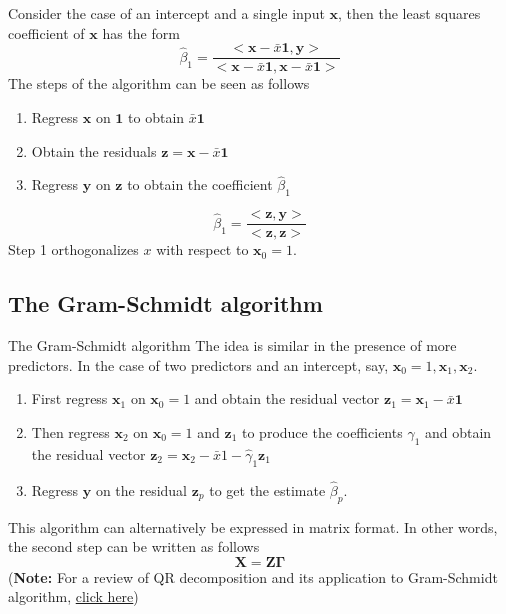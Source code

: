 \documentclass{beamer}
\newcommand{\x}{\bm{x}}
\newcommand{\X}{\bm{X}}
\newcommand{\z}{\bm{z}}
\newcommand{\y}{\bm{y}}
\begin{document}
\begin{frame}
Consider the case of an intercept and a single input $\bm{x}$, then the least squares coefficient of $\bm{x}$ has the form
\[
\hat{\beta}_1=\frac{<\bm{x}-\bar{x}\bm{1},\bm{y}>}{<\bm{x}-\bar{x}\bm{1},\bm{x}-\bar{x}\bm{1}>}
\]
The steps of the algorithm can be seen as follows
\begin{enumerate}
\item{} Regress $\bm{x}$ on $\bm{1}$ to obtain $\bar{x}\bm{1}$

\item{} Obtain the residuals $\bm{z}=\bm{x}-\bar{x}\bm{1}$

\item{} Regress $\bm{y}$ on $\bm{z}$ to obtain the coefficient $\hat{\beta}_1$
\end{enumerate}
\[
\hat{\beta}_1=\frac{<\bm{z},\bm{y}>}{<\bm{z},\bm{z}>}
\]
Step 1 orthogonalizes $x$ with respect to $\bm{x}_0=1$.  
\end{frame}
\subsection{The Gram-Schmidt algorithm}
\begin{frame}{The Gram-Schmidt algorithm}
The idea is similar in the presence of more predictors. In the case of two predictors and an intercept, say, $\bm{x}_0=1, \bm{x}_1,\bm{x}_2$.
\begin{enumerate}
 \item{} First regress $\bm{x}_1$ on $\bm{x}_0=1$ and obtain the residual vector $\bm{z}_1=\bm{x}_1-\bar{x}\bm{1}$

\item{} Then regress $\bm{x}_2$ on $\x_0=1$ and $\z_1$ to produce the coefficients $\hat{\gamma}_1$ and obtain the residual vector $\z_2=\x_2-\bar{x}1-\hat{\gamma}_1\z_1$

\item{} Regress $\y$ on the residual $\z_p$ to get the estimate $\hat{\beta}_p$.
\end{enumerate}
This algorithm can alternatively be expressed in matrix format. In other words, the second step can be written as follows
\[
\X=\bm{Z}\bm{\Gamma}
\]
(\textbf{Note:} For a review of QR decomposition and its application to Gram-Schmidt algorithm, \href{http://www.seas.ucla.edu/~vandenbe/133A/lectures/qr.pdf}{click here})
\end{frame}
\end{document}
